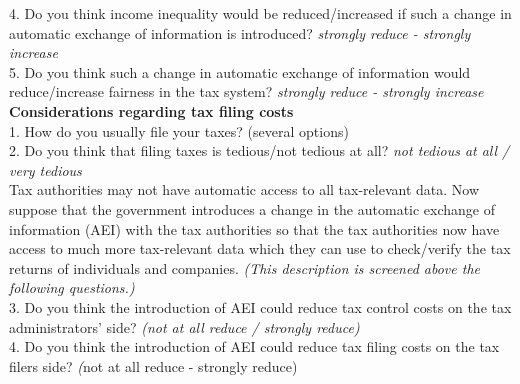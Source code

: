 \documentclass[11pt]{article}
\begin{document}
4. Do you think income inequality would be reduced/increased if such a change in automatic exchange of information is introduced? \textit{strongly reduce - strongly increase}\\[0.5em]
5. Do you think such a change in automatic exchange of information would reduce/increase fairness in the tax system? \textit{strongly reduce - strongly increase}\\[1em]
\textbf{Considerations regarding tax filing costs} \\[0.5em]
1. How do you usually file your taxes? \textit{}(several options)\\[0.5em]
2. Do you think that filing taxes is tedious/not tedious at all? \textit{not tedious at all / very tedious} \\[1em]
Tax authorities may not have automatic access to all tax-relevant data. Now suppose that the government introduces a change in the automatic exchange of information (AEI) with the tax authorities so that the tax authorities now have access to much more tax-relevant data which they can use to check/verify the tax returns of individuals and companies. \textit{(This description is screened above the following questions.)} \\[0.5em]
3. Do you think the introduction of AEI could reduce tax control costs on the tax administrators’ side? \textit{(not at all reduce / strongly reduce)} \\[0.5em]
4. Do you think the introduction of AEI could reduce tax filing costs on the tax filers side? \textit(not at all reduce - strongly reduce)
\end{document}
